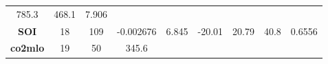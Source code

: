 \documentclass[]{article}
\theoremstyle{definition}
\theoremstyle{definition}
\theoremstyle{definition}
\theoremstyle{remark}
\begin{document}
\begin{longtable}[]{@{}ccccccccc@{}}
\begin{minipage}[t]{0.07\columnwidth}
785.3\strut
\end{minipage} & \begin{minipage}[t]{0.07\columnwidth}\centering\strut
468.1\strut
\end{minipage} & \begin{minipage}[t]{0.08\columnwidth}\centering\strut
7.906\strut
\end{minipage}\tabularnewline
\begin{minipage}[t]{0.14\columnwidth}\centering\strut
\textbf{SOI}\strut
\end{minipage} & \begin{minipage}[t]{0.06\columnwidth}\centering\strut
18\strut
\end{minipage} & \begin{minipage}[t]{0.05\columnwidth}\centering\strut
109\strut
\end{minipage} & \begin{minipage}[t]{0.11\columnwidth}\centering\strut
-0.002676\strut
\end{minipage} & \begin{minipage}[t]{0.08\columnwidth}\centering\strut
6.845\strut
\end{minipage} & \begin{minipage}[t]{0.08\columnwidth}\centering\strut
-20.01\strut
\end{minipage} & \begin{minipage}[t]{0.07\columnwidth}\centering\strut
20.79\strut
\end{minipage} & \begin{minipage}[t]{0.07\columnwidth}\centering\strut
40.8\strut
\end{minipage} & \begin{minipage}[t]{0.08\columnwidth}\centering\strut
0.6556\strut
\end{minipage}\tabularnewline
\begin{minipage}[t]{0.14\columnwidth}\centering\strut
\textbf{co2mlo}\strut
\end{minipage} & \begin{minipage}[t]{0.06\columnwidth}\centering\strut
19\strut
\end{minipage} & \begin{minipage}[t]{0.05\columnwidth}\centering\strut
50\strut
\end{minipage} & \begin{minipage}[t]{0.11\columnwidth}\centering\strut
345.6\strut
\end{minipage} & \begin{minipage}[t]{0.08\columnwidth}\centering\strut

\end{minipage}
\end{longtable}
\end{document}
